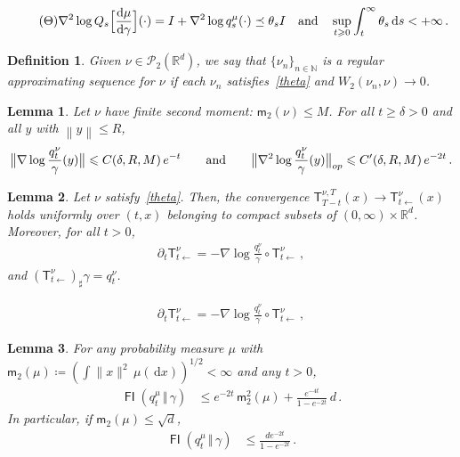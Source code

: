 \documentclass[10pt,a4paper]{amsart}
\newtheorem{lemma}{Lemma}
\newtheorem{definition}{Definition}
\DeclareMathOperator*{\FI}{\mathsf{FI}}
\newcommand{\KM}{\mathsf T}
\newcommand{\N}{\mathbb{N}}
\newcommand{\R}{\RR}
\newcommand{\RR}{\mathbb{R}}
\newcommand{\cP}{\mathcal{P}}
\newcommand*{\dd}{\, \rd}
\newcommand*{\defeq}{\coloneqq}
\renewcommand{\ge}{\geqslant}
\renewcommand{\le}{\leqslant}
\newcommand{\mmid}{\,\Vert\,}
\newcommand{\mom}{\mathsf m_2}
\newcommand*{\norm}[1]{\left\|#1\right\|}
\newcommand*{\rd}{\mathrm{d}}
\begin{document}
\begin{align}\label{theta}\tag{$\Theta$}
    \nabla^2 \log Q_s\Bigl[\frac{\!\dd\mu}{\!\dd\gamma}\Bigr](\cdot) = I + \nabla^2 \log q^\mu_s(\cdot) \preceq \theta_s I \quad \text{and}\quad \sup_{t\ge 0}\int_t^\infty \theta_s \dd s < +\infty\,.
\end{align}

\begin{definition}\label{def:reg_approx}
Given $\nu \in \cP_2(\R^d)$, we say that $\{\nu_n\}_{n\in\N}$ is a regular approximating sequence for $\nu$ if each $\nu_n$ satisfies~\eqref{theta} and $W_2(\nu_n,\nu) \to 0$.
\end{definition}

\begin{lemma}\label{lem:technical_estimates}
    Let $\nu$ have finite second moment: $\mom(\nu) \le M$. For all $t\ge \delta > 0$ and all $y$ with $\norm y \le R$,
        \begin{align*}
            \bigl\lVert \nabla \log \frac{q_t^\nu}{\gamma}(y)\bigr\rVert \le C(\delta,R,M)\,e^{-t} \qquad\text{and}\qquad
            \bigl\lVert \nabla^2 \log \frac{q_t^\nu}{\gamma}(y)\bigr\rVert_{\rm op} \le C'(\delta,R,M)\,e^{-2t}\,.
        \end{align*}
\end{lemma}

\begin{lemma}\label{lem:km_regular_case}
    Let $\nu$ satisfy~\eqref{theta}.
    Then, the convergence $\KM^{\nu,T}_{T-t}(x) \to \KM^\nu_{t\gets}(x)$ holds uniformly over $(t,x)$ belonging to compact subsets of $(0,\infty)\times \R^d$.
    Moreover, for all $t > 0$,
    \begin{align}\label{eq:deriv_km_map}
        \partial_t \KM^\nu_{t\gets} = -\nabla \log \frac{q_t^\nu}{\gamma}\circ \KM^\nu_{t\gets}\,,
    \end{align}
    and $(\KM^\nu_{t\gets})_\sharp \gamma = q_t^\nu$.
\end{lemma}

    \begin{align}
        \partial_t \KM^\nu_{t\gets} = -\nabla \log \frac{q_t^\nu}{\gamma}\circ \KM^\nu_{t\gets}\,,
    \end{align}

\begin{lemma}\label{lem:FI_abs_bound}
    For any probability measure $\mu$ with $\mom(\mu) \defeq (\int \|x\|^2\,\mu(\!\dd x))^{1/2} < \infty$ and any $t > 0$,
    \begin{align*}
        \FI(q_t^\mu\mmid \gamma)
        &\le e^{-2t}\,\mom^2(\mu) + \frac{e^{-4t}}{1-e^{-2t}}\,d\,.
    \end{align*}
    In particular, if $\mom(\mu) \le \sqrt d$,
    \begin{align*}
        \FI(q_t^\mu\mmid \gamma)
        &\le \frac{de^{-2t}}{1-e^{-2t}}\,.
    \end{align*}
\end{lemma}
\end{document}
